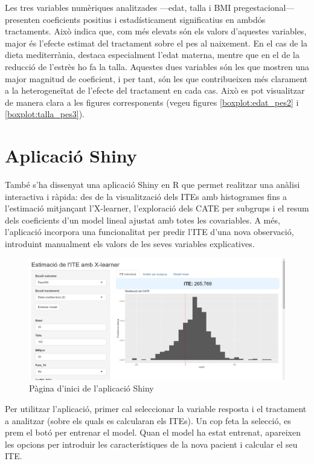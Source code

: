 \documentclass[../main.tex]{subfiles}
\begin{document}
    Les tres variables numèriques analitzades —edat, talla i BMI pregestacional— presenten coeficients positius i estadísticament significatius en ambdós tractaments. Això indica que, com més elevats són els valors d’aquestes variables, major és l’efecte estimat del tractament sobre el pes al naixement.
    En el cas de la dieta mediterrània, destaca especialment l’edat materna, mentre que en el de la reducció de l’estrès ho fa la talla. Aquestes dues variables són les que mostren una major magnitud de coeficient, i per tant, són les que contribueixen més clarament a la heterogeneïtat de l’efecte del tractament en cada cas. Això es pot visualitzar de manera clara a les figures corresponents (vegeu figures \ref{boxplot:edat_pes2} i \ref{boxplot:talla_pes3}).    
    

    \section{Aplicació Shiny}

    També s’ha dissenyat una aplicació Shiny en R que permet realitzar una anàlisi interactiva i ràpida: des de la visualització dels ITEs amb histogrames fins a l’estimació mitjançant l’X-learner, l’exploració dels CATE per subgrups i el resum dels coeficients d’un model lineal ajustat amb totes les covariables. A més, l’aplicació incorpora una funcionalitat per predir l’ITE d’una nova observació, introduint manualment els valors de les seves variables explicatives.
    
    \begin{figure}[!h]
        \centering
        \includegraphics[width=0.9\linewidth]{imgs/pestanya1_shiny.jpg}
        \caption{Pàgina d’inici de l’aplicació Shiny}
    \end{figure}
    
    Per utilitzar l’aplicació, primer cal seleccionar la variable resposta i el tractament a analitzar (sobre els quals es calcularan els ITEs). Un cop feta la selecció, es prem el botó per entrenar el model. Quan el model ha estat entrenat, apareixen les opcions per introduir les característiques de la nova pacient i calcular el seu ITE.\par
    
\end{document}
